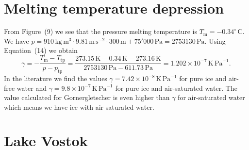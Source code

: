 \documentclass[DIV15,11pt,parskip=half]{scrartcl}
\newcommand{\cels}[1]{\ensuremath{#1^{\circ}\,\mathrm{C}}}
\begin{document}
\section{Melting temperature depression}

From Figure~(9) we see that the pressure melting temperature is $T_{\mathrm{m}} = -\cels{0.34}$. We have $p = 910\,\mathrm{kg}\,\mathrm{m}^{3} \cdot 9.81\,\mathrm{m}\,\mathrm{s}^{-2}\cdot 300\,\mathrm{m} + 75'000\,\mathrm{Pa} = 2753130\,\mathrm{Pa}$. Using Equation~(14) we obtain
  \begin{equation*}
    \gamma = -\frac{T_{\mathrm{m}}-T_{\mathrm{tp}}}{p - p_{\mathrm{tp}}} = \frac{273.15\,\mathrm{K} -0.34\,\mathrm{K} -273.16\,\mathrm{K}}{2753130\,\mathrm{Pa} - 611.73\,\mathrm{Pa}} = 1.202\times 10^{-7}\,\mathrm{K}\,\mathrm{Pa}^{-1}.
  \end{equation*} In the literature we find the values $\gamma = 7.42 \times 10^{-8} \,\mathrm{K}\,\mathrm{Pa}^{-1}$ for pure ice and air-free water and $\gamma = 9.8 \times 10^{-7} \,\mathrm{K}\,\mathrm{Pa}^{-1}$ for pure ice and air-saturated water. The value calculated for Gornergletscher is even higher than $\gamma$ for air-saturated water which means we have ice with air-saturated water.


\section{Lake Vostok}
\end{document}
